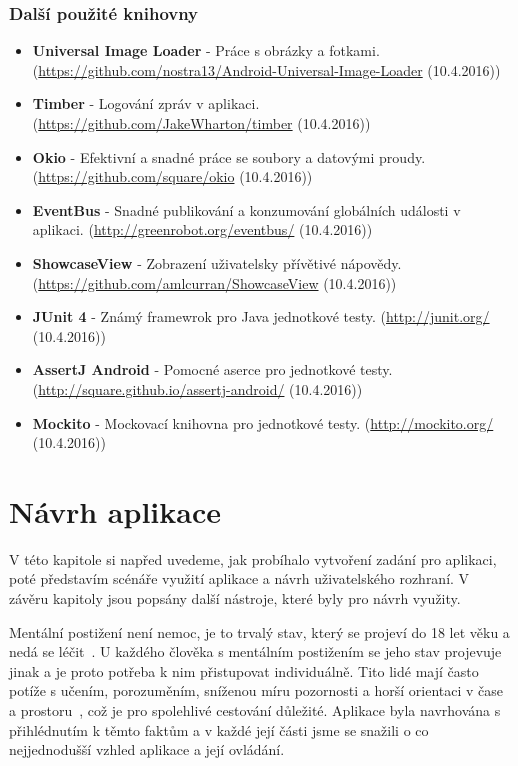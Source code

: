 \documentclass[czech,master,public,dept460,male,java,cpdeclaration]{diploma}
\begin{document}
\subsubsection{Další použité knihovny}
\begin{itemize}
  \item \textbf{Universal Image Loader} - Práce s obrázky a fotkami. (\url{https://github.com/nostra13/Android-Universal-Image-Loader} (10.4.2016))
  \item \textbf{Timber} - Logování zpráv v aplikaci. (\url{https://github.com/JakeWharton/timber} (10.4.2016))
  \item \textbf{Okio} - Efektivní a snadné práce se soubory a datovými proudy. (\url{https://github.com/square/okio} (10.4.2016))
  \item \textbf{EventBus} - Snadné publikování a konzumování globálních události v aplikaci. (\url{http://greenrobot.org/eventbus/} (10.4.2016))
  \item \textbf{ShowcaseView} - Zobrazení uživatelsky přívětivé nápovědy. (\url{https://github.com/amlcurran/ShowcaseView} (10.4.2016))
  \item \textbf{JUnit 4} - Známý framewrok pro Java jednotkové testy. (\url{http://junit.org/} (10.4.2016))
  \item \textbf{AssertJ Android} - Pomocné aserce pro jednotkové testy. (\url{http://square.github.io/assertj-android/} (10.4.2016))
  \item \textbf{Mockito} - Mockovací knihovna pro jednotkové testy. (\url{http://mockito.org/} (10.4.2016))


\end{itemize}

\section{Návrh aplikace}
V této kapitole si napřed uvedeme, jak probíhalo vytvoření zadání pro aplikaci,
poté představím scénáře využití aplikace a návrh uživatelského rozhraní. V závěru kapitoly jsou popsány
další nástroje, které byly pro návrh využity.

Mentální postižení není nemoc, je to trvalý stav, který se projeví do 18 let věku a nedá se léčit~\cite{komunikace}.
U každého člověka s mentálním postižením se jeho stav projevuje jinak a je proto potřeba k nim
přistupovat individuálně. Tito lidé mají často potíže s učením, porozuměním, sníženou míru pozornosti
a horší orientaci v čase a prostoru~\cite{komunikace}, což je pro spolehlivé cestování důležité.
Aplikace byla navrhována s přihlédnutím k těmto faktům a v každé její části jsme se snažili o co nejjednodušší
vzhled aplikace a její ovládání.
\end{document}
